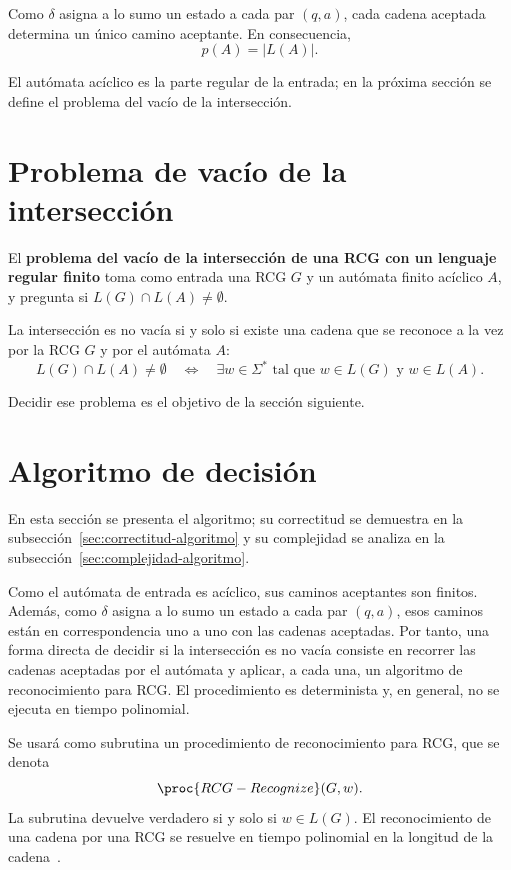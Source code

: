 Como $\delta$ asigna a lo sumo un estado a cada par $(q,a)$, cada
cadena aceptada determina un único camino aceptante. En consecuencia,
\[
  p(A)=|L(A)|.
\]

El autómata acíclico es la parte regular de la entrada; en la próxima
sección se define el problema del vacío de la intersección.

\section{Problema de vacío de la intersección}
\label{sec:problema-vacio-interseccion}

El
\textbf{problema del vacío de la intersección de una RCG con un lenguaje
regular finito} toma como entrada una RCG $G$ y un autómata
finito acíclico $A$, y pregunta si $L(G) \cap L(A) \neq \emptyset$.

La intersección es no vacía si y solo si existe una cadena que se
reconoce a la vez por la RCG $G$ y por el autómata $A$:
\[
  L(G) \cap L(A) \neq \emptyset
  \quad \Longleftrightarrow \quad
  \exists w \in \Sigma^* \text{ tal que } w \in L(G) \text{ y } w \in L(A).
\]

Decidir ese problema es el objetivo de la sección siguiente.

\section{Algoritmo de decisión}
\label{sec:algoritmo-decision}

En esta sección se presenta el algoritmo; su correctitud se demuestra en
la subsección~\ref{sec:correctitud-algoritmo} y su complejidad se analiza
en la subsección~\ref{sec:complejidad-algoritmo}.

Como el autómata de entrada es acíclico, sus caminos aceptantes son
finitos. Además, como $\delta$ asigna a lo sumo un estado a cada par
$(q,a)$, esos caminos están en correspondencia uno a uno con las
cadenas aceptadas. Por tanto, una
forma directa de decidir si la intersección es no vacía consiste en
recorrer las cadenas aceptadas por el autómata y aplicar, a cada una, un
algoritmo de reconocimiento para RCG. El procedimiento es
determinista y, en general, no se ejecuta en tiempo polinomial.

Se usará como subrutina un procedimiento de reconocimiento para RCG, que
se denota
\[
  \proc{RCG-Recognize}(G,w).
\]
La subrutina devuelve verdadero si y solo si $w \in L(G)$. El
reconocimiento de una cadena por una RCG se resuelve en tiempo
polinomial en la longitud de la
cadena~\cite{boullier1998proposal,kallmeyer2010parsing}.

